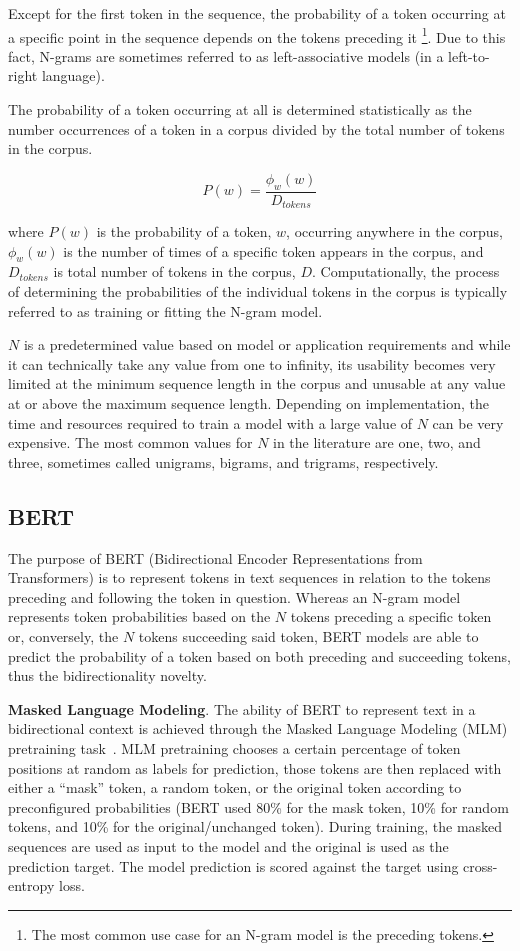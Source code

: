 \documentclass[12pt]{article}
\begin{document}
\noindent
Except for the first token in the sequence, the probability of a token occurring at a specific point in the sequence depends on the tokens preceding it
\footnote{The most common use case for an N-gram model is the preceding tokens.}. Due to this fact, N-grams are sometimes referred to as
left-associative models (in a left-to-right language).

The probability of a token occurring at all is determined statistically as the number occurrences of a token in a corpus divided by the total number
of tokens in the corpus.

\begin{equation}\label{eq:ngram_prob_wj}
    P(w) = \frac{\phi_w(w)}{D_{tokens}}
\end{equation}

\noindent
where $P(w)$ is the probability of a token, $w$, occurring anywhere in the corpus, $\phi_w(w)$ is the number of times of a specific
token appears in the corpus, and $D_{tokens}$ is total number of tokens in the corpus, $D$. Computationally, the process of determining the
probabilities of the individual tokens in the corpus is typically referred to as training or fitting the N-gram model.

$N$ is a predetermined value based on model or application requirements and while it can technically take any value from one to infinity, its
usability becomes very limited at the minimum sequence length in the corpus and unusable at any value at or above the maximum sequence length.
Depending on implementation, the time and resources required to train a model with a large value of $N$ can be very expensive. The most common values
for $N$ in the literature are one, two, and three, sometimes called unigrams, bigrams, and trigrams, respectively.

\subsection{BERT}\label{sec:bert}
The purpose of BERT (Bidirectional Encoder Representations from Transformers) is to represent tokens in text sequences in relation to the tokens
preceding and following the token in question. Whereas an N-gram model represents token probabilities based on the $N$ tokens preceding a specific
token or, conversely, the $N$ tokens succeeding said token, BERT models are able to predict the probability of a token based on both preceding and
succeeding tokens, thus the bidirectionality novelty.

\textbf{Masked Language Modeling}. The ability of BERT to represent text in a bidirectional context is achieved through the Masked Language Modeling
(MLM) pretraining task~\cite{devlin_bert_2019}. MLM pretraining chooses a certain percentage of token positions at random as labels for prediction,
those tokens are then replaced with either a ``mask'' token, a random token, or the original token according to preconfigured probabilities (BERT used
80\% for the mask token, 10\% for random tokens, and 10\% for the original/unchanged token). During training, the masked sequences are used as input
to the model and the original is used as the prediction target. The model prediction is scored against the target using cross-entropy loss.
\end{document}
